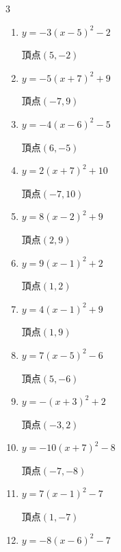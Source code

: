 \begin{multicols}{3}
\begin{enumerate}
        $\displaystyle 頂点\left( -8 , 1 \right)$

  \item $\displaystyle y=-3\left( x-5\right)^{2}-2$

        $\displaystyle 頂点\left( 5 , -2 \right)$

  \item $\displaystyle y=-5\left( x+7\right)^{2}+9$

        $\displaystyle 頂点\left( -7 , 9 \right)$

  \item $\displaystyle y=-4\left( x-6\right)^{2}-5$

        $\displaystyle 頂点\left( 6 , -5 \right)$

  \item $\displaystyle y=2\left( x+7\right)^{2}+10$

        $\displaystyle 頂点\left( -7 , 10 \right)$

  \item $\displaystyle y=8\left( x-2\right)^{2}+9$

        $\displaystyle 頂点\left( 2 , 9 \right)$

  \item $\displaystyle y=9\left( x-1\right)^{2}+2$

        $\displaystyle 頂点\left( 1 , 2 \right)$

  \item $\displaystyle y=4\left( x-1\right)^{2}+9$

        $\displaystyle 頂点\left( 1 , 9 \right)$

  \item $\displaystyle y=7\left( x-5\right)^{2}-6$

        $\displaystyle 頂点\left( 5 , -6 \right)$

  \item $\displaystyle y=-\left( x+3\right)^{2}+2$

        $\displaystyle 頂点\left( -3 , 2 \right)$

  \item $\displaystyle y=-10\left( x+7\right)^{2}-8$

        $\displaystyle 頂点\left( -7 , -8 \right)$

  \item $\displaystyle y=7\left( x-1\right)^{2}-7$

        $\displaystyle 頂点\left( 1 , -7 \right)$

  \item $\displaystyle y=-8\left( x-6\right)^{2}-7$


\end{enumerate}
\end{multicols}
